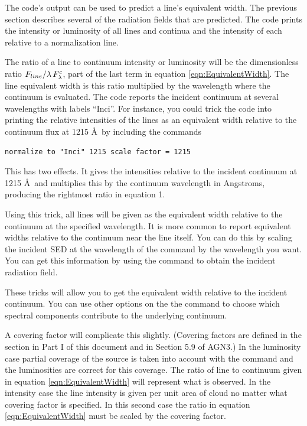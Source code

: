 The code's output can be used to predict a line's equivalent width.
The previous section describes several of the radiation fields
that are predicted.
The code prints the intensity or luminosity of all lines and continua and
the intensity of each relative to a normalization line.

The ratio of a line to continuum intensity or luminosity will be the
dimensionless ratio ${{{F_{line}}} \mathord{\left/
{\vphantom {{{F_{line}}} {\lambda \,F_\lambda ^c}}} \right.
 \kern-\nulldelimiterspace} {\lambda \,F_\lambda ^c}}$,
part of the last term in equation \ref{eqn:EquivalentWidth}.
The line equivalent width is
this ratio multiplied by the wavelength where the continuum is evaluated.
The code reports the incident continuum at several wavelengths with labels ``Inci''.
For instance, you could trick the code into printing
the relative intensities
of the lines as an equivalent width relative to the
continuum flux at 1215 \AA\ by including the commands
\begin{verbatim}
normalize to "Inci" 1215 scale factor = 1215
\end{verbatim}
This has two effects.
It gives the intensities relative to the
incident continuum at 1215 \AA\ and multiplies this by the continuum
wavelength in Angstroms, producing the rightmost ratio in equation 1.

Using this trick, all lines will be given as the equivalent width relative to the continuum at the
specified wavelength.  
It is more common to report equivalent widths relative to the continuum near the line itself.
You can do this by scaling the incident SED at the wavelength 
of the  command  by the
wavelength you want.  You can get this information by using the
 command to obtain the incident radiation field.

These tricks will allow you to get the equivalent width relative to the incident continuum.
You can use other options on the the  command to
choose which spectral components contribute to the underlying continuum.

A covering factor will complicate this slightly.
(Covering factors are
defined in the section  in Part I
of this document and in Section 5.9 of AGN3.)
In the luminosity case partial coverage of the source is
taken into account with the  command
and the luminosities are correct for this coverage.
The ratio of line to continuum given in
equation \ref{eqn:EquivalentWidth} will represent what is observed.
In the intensity case the line
intensity is given per unit area of cloud no matter what covering factor
is specified.
In this second case the ratio in equation \ref{eqn:EquivalentWidth}
must be scaled by the covering factor.

